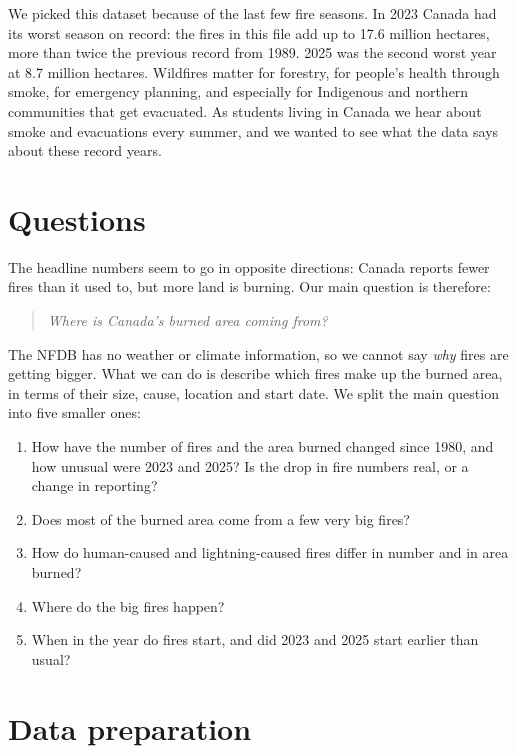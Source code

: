 \documentclass[12pt]{article}
\begin{document}
We picked this dataset because of the last few fire seasons. In 2023 Canada
had its worst season on record: the fires in this file add up to 17.6 million
hectares, more than twice the previous record from 1989. 2025 was the second
worst year at 8.7 million hectares. Wildfires matter for forestry, for
people's health through smoke, for emergency planning, and especially for
Indigenous and northern communities that get evacuated. As students living in
Canada we hear about smoke and evacuations every summer, and we wanted to see
what the data says about these record years.

\section{Questions}

The headline numbers seem to go in opposite directions: Canada reports fewer
fires than it used to, but more land is burning. Our main question is
therefore:

\begin{quote}
\emph{Where is Canada's burned area coming from?}
\end{quote}

The NFDB has no weather or climate information, so we cannot say \emph{why}
fires are getting bigger. What we can do is describe which fires make up the
burned area, in terms of their size, cause, location and start date. We split
the main question into five smaller ones:

\begin{enumerate}\setlength{\itemsep}{0pt}
  \item How have the number of fires and the area burned changed since 1980,
        and how unusual were 2023 and 2025? Is the drop in fire numbers real,
        or a change in reporting?
  \item Does most of the burned area come from a few very big fires?
  \item How do human-caused and lightning-caused fires differ in number and
        in area burned?
  \item Where do the big fires happen?
  \item When in the year do fires start, and did 2023 and 2025 start earlier
        than usual?
\end{enumerate}

\section{Data preparation}
\end{document}
